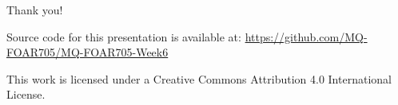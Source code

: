 \documentclass[aspectratio=1610, 11pt]{beamer} %
\begin{document}




  


\begin{frame}{Thank you!}


Source code for this presentation is available at: \url{https://github.com/MQ-FOAR705/MQ-FOAR705-Week6}

This work is licensed under a Creative Commons Attribution 4.0 International License.

\end{frame}
\end{document}

